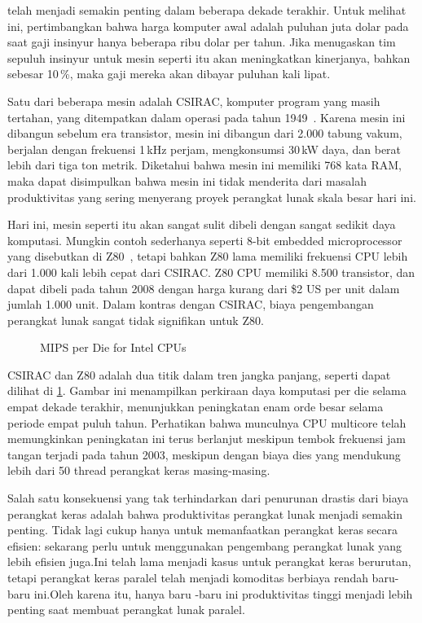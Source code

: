  telah menjadi semakin penting dalam beberapa dekade terakhir.
Untuk melihat ini, pertimbangkan bahwa harga komputer awal adalah
puluhan juta dolar pada saat gaji insinyur hanya beberapa ribu dolar per tahun.
Jika menugaskan tim sepuluh insinyur untuk mesin seperti itu akan meningkatkan
kinerjanya, bahkan sebesar 10\,\%, maka gaji mereka
akan dibayar puluhan kali lipat.

Satu dari beberapa mesin adalah CSIRAC, komputer program yang masih
tertahan, yang ditempatkan dalam operasi pada tahun 1949~\cite{CSIRACMuseumVictoria,CSIRACUniversityMelbourne}.
Karena mesin ini dibangun sebelum era transistor, mesin ini dibangun
dari 2.000 tabung vakum, berjalan dengan frekuensi 1\,kHz perjam,
mengkonsumsi 30\,kW daya, dan berat lebih dari tiga ton metrik.
Diketahui bahwa mesin ini memiliki 768 kata RAM, maka dapat disimpulkan
bahwa mesin ini tidak menderita dari masalah produktivitas yang sering
menyerang proyek perangkat lunak skala besar hari ini.

Hari ini, mesin seperti itu akan sangat sulit dibeli dengan
sangat sedikit daya komputasi.
Mungkin contoh sederhanya seperti 8-bit embedded microprocessor yang
disebutkan di Z80~\cite{z80Wikipedia}, tetapi bahkan Z80 lama
memiliki frekuensi CPU lebih dari 1.000 kali lebih cepat dari CSIRAC.
Z80 CPU memiliki 8.500 transistor, dan dapat dibeli pada tahun 2008
dengan harga kurang dari \$2 US per unit dalam jumlah 1.000 unit.
Dalam kontras dengan CSIRAC, biaya pengembangan perangkat lunak
sangat tidak signifikan untuk Z80.

\begin{figure}
\centering
{}
\caption{MIPS per Die for Intel CPUs}
\label{fig:intro:MIPS per Die for Intel CPUs}
\end{figure}

CSIRAC dan Z80 adalah dua titik dalam tren jangka panjang, seperti
dapat dilihat di \cref{fig:intro:MIPS per Die for Intel CPUs}.
Gambar ini menampilkan perkiraan daya komputasi per die selama
empat dekade terakhir, menunjukkan peningkatan enam orde besar
selama periode empat puluh tahun.
Perhatikan bahwa munculnya CPU multicore telah memungkinkan peningkatan
ini terus berlanjut meskipun tembok frekuensi jam tangan terjadi pada
tahun 2003, meskipun dengan biaya dies yang mendukung lebih dari 50
thread perangkat keras masing-masing.

Salah satu konsekuensi yang tak terhindarkan dari penurunan drastis dari biaya
perangkat keras adalah bahwa produktivitas perangkat lunak menjadi semakin
penting.
Tidak lagi cukup hanya untuk memanfaatkan perangkat keras secara
efisien: sekarang perlu untuk menggunakan pengembang perangkat lunak yang lebih
efisien juga.Ini telah lama menjadi kasus untuk perangkat keras berurutan,
tetapi perangkat keras paralel telah menjadi komoditas berbiaya rendah baru-baru
ini.Oleh karena itu, hanya baru -baru ini produktivitas tinggi menjadi lebih
penting saat membuat perangkat lunak paralel.


